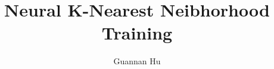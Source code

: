 \documentclass[12pt,a4paper]{article}
\begin{document}
\title{Neural K-Nearest Neibhorhood Training}
\author{Guannan Hu}
\maketitle



\end{document}
